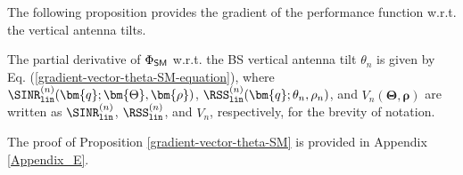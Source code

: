 The following proposition provides the gradient of the performance function w.r.t. the vertical antenna tilts.
\begin{Proposition}\label{gradient-vector-theta-SM}
    The partial derivative of $\Phi_{{\sf SM}}$ w.r.t. the BS vertical antenna tilt $\theta_n$ is given by Eq. (\ref{gradient-vector-theta-SM-equation}),
where $\SINR^{(n)}_{\mathtt{lin}}(\bm{q}; \bm{\Theta}, \bm{\rho})$, $\RSS^{(n)}_{\mathtt{lin}}(\bm{q}; \theta_n, \rho_n)$, and $V_n(\bm{\Theta}, \bm{\rho})$ are written as $\SINR^{(n)}_{\mathtt{lin}} $, $\RSS^{(n)}_{\mathtt{lin}}$, and $V_n$, respectively, for the brevity of notation.
\end{Proposition}
The proof of Proposition \ref{gradient-vector-theta-SM} is provided in Appendix \ref{Appendix_E}.



